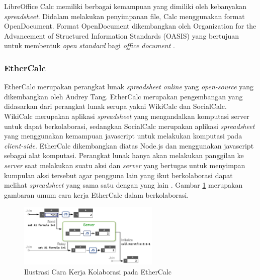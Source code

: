     LibreOffice Calc memiliki berbagai kemampuan yang dimiliki oleh kebanyakan \textit{spreadsheet}. Didalam melakukan penyimpanan file, Calc menggunakan format OpenDocument. Format OpenDocument dikembangkan oleh Organization for the Advancement of Structured Information Standards (OASIS) yang bertujuan untuk membentuk \textit{open standard} bagi \textit{office document} \parencite{OpenDocument}. 

    \subsubsection{EtherCalc}
    EtherCalc merupakan perangkat lunak \textit{spreadsheet online} yang \textit{open-source} yang dikembangkan oleh Audrey Tang. EtherCalc merupakan pengembangan yang didasarkan dari perangkat lunak serupa yakni WikiCalc dan SocialCalc. WikiCalc merupakan aplikasi \textit{spreadsheet} yang mengandalkan komputasi server untuk dapat berkolaborasi, sedangkan SocialCalc merupakan aplikasi \textit{spreadsheet} yang menggunakan kemampuan javascript untuk melakukan komputasi pada \textit{client-side}. EtherCalc dikembangkan diatas Node.js dan menggunakan javascript sebagai alat komputasi. Perangkat lunak hanya akan melakukan panggilan ke \textit{server} saat melakukan suatu aksi dan \textit{server} yang bertugas untuk menyimpan kumpulan aksi tersebut agar pengguna lain yang ikut berkolaborasi dapat melihat \textit{spreadsheet} yang sama satu dengan yang lain \parencite{EtherCalc}. Gambar \ref{IlustrasiEtherCalc} merupakan gambaran umum cara kerja EtherCalc dalam berkolaborasi.

    \begin{figure}[htb]
        \centering
        \includegraphics[width=0.6\textwidth]{resources/chapter-2-ethercalc.png}
        \caption{Ilustrasi Cara Kerja Kolaborasi pada EtherCalc}
        \label{IlustrasiEtherCalc}
    \end{figure}

